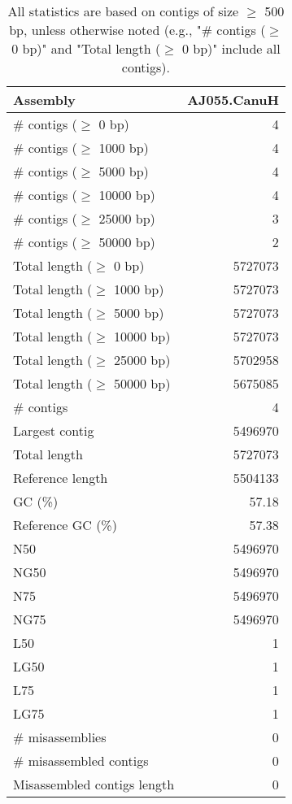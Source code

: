 \documentclass[12pt,a4paper]{article}
\begin{document}
\begin{table}[ht]
\begin{center}
\caption{All statistics are based on contigs of size $\geq$ 500 bp, unless otherwise noted (e.g., "\# contigs ($\geq$ 0 bp)" and "Total length ($\geq$ 0 bp)" include all contigs).}
\begin{tabular}{|l*{1}{|r}|}
\hline
Assembly & AJ055.CanuH \\ \hline
\# contigs ($\geq$ 0 bp) & 4 \\ \hline
\# contigs ($\geq$ 1000 bp) & 4 \\ \hline
\# contigs ($\geq$ 5000 bp) & 4 \\ \hline
\# contigs ($\geq$ 10000 bp) & 4 \\ \hline
\# contigs ($\geq$ 25000 bp) & 3 \\ \hline
\# contigs ($\geq$ 50000 bp) & 2 \\ \hline
Total length ($\geq$ 0 bp) & 5727073 \\ \hline
Total length ($\geq$ 1000 bp) & 5727073 \\ \hline
Total length ($\geq$ 5000 bp) & 5727073 \\ \hline
Total length ($\geq$ 10000 bp) & 5727073 \\ \hline
Total length ($\geq$ 25000 bp) & 5702958 \\ \hline
Total length ($\geq$ 50000 bp) & 5675085 \\ \hline
\# contigs & 4 \\ \hline
Largest contig & 5496970 \\ \hline
Total length & 5727073 \\ \hline
Reference length & 5504133 \\ \hline
GC (\%) & 57.18 \\ \hline
Reference GC (\%) & 57.38 \\ \hline
N50 & 5496970 \\ \hline
NG50 & 5496970 \\ \hline
N75 & 5496970 \\ \hline
NG75 & 5496970 \\ \hline
L50 & 1 \\ \hline
LG50 & 1 \\ \hline
L75 & 1 \\ \hline
LG75 & 1 \\ \hline
\# misassemblies & 0 \\ \hline
\# misassembled contigs & 0 \\ \hline
Misassembled contigs length & 0 \\ \hline

\end{tabular}
\end{center}
\end{table}
\end{document}
